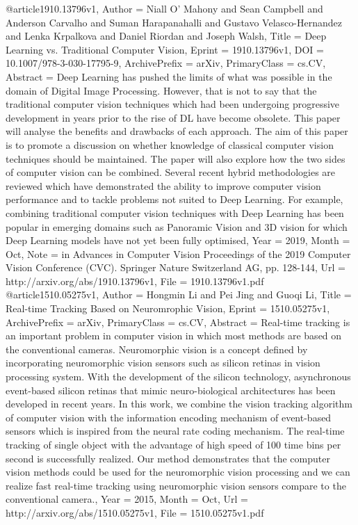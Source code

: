 @article{1910.13796v1,
Author        = {Niall O' Mahony and Sean Campbell and Anderson Carvalho and Suman Harapanahalli and Gustavo Velasco-Hernandez and Lenka Krpalkova and Daniel Riordan and Joseph Walsh},
Title         = {Deep Learning vs. Traditional Computer Vision},
Eprint        = {1910.13796v1},
DOI           = {10.1007/978-3-030-17795-9},
ArchivePrefix = {arXiv},
PrimaryClass  = {cs.CV},
Abstract      = {Deep Learning has pushed the limits of what was possible in the domain of
Digital Image Processing. However, that is not to say that the traditional
computer vision techniques which had been undergoing progressive development in
years prior to the rise of DL have become obsolete. This paper will analyse the
benefits and drawbacks of each approach. The aim of this paper is to promote a
discussion on whether knowledge of classical computer vision techniques should
be maintained. The paper will also explore how the two sides of computer vision
can be combined. Several recent hybrid methodologies are reviewed which have
demonstrated the ability to improve computer vision performance and to tackle
problems not suited to Deep Learning. For example, combining traditional
computer vision techniques with Deep Learning has been popular in emerging
domains such as Panoramic Vision and 3D vision for which Deep Learning models
have not yet been fully optimised},
Year          = {2019},
Month         = {Oct},
Note          = {in Advances in Computer Vision Proceedings of the 2019 Computer
  Vision Conference (CVC). Springer Nature Switzerland AG, pp. 128-144},
Url           = {http://arxiv.org/abs/1910.13796v1},
File          = {1910.13796v1.pdf}
}
@article{1510.05275v1,
Author        = {Hongmin Li and Pei Jing and Guoqi Li},
Title         = {Real-time Tracking Based on Neuromrophic Vision},
Eprint        = {1510.05275v1},
ArchivePrefix = {arXiv},
PrimaryClass  = {cs.CV},
Abstract      = {Real-time tracking is an important problem in computer vision in which most
methods are based on the conventional cameras. Neuromorphic vision is a concept
defined by incorporating neuromorphic vision sensors such as silicon retinas in
vision processing system. With the development of the silicon technology,
asynchronous event-based silicon retinas that mimic neuro-biological
architectures has been developed in recent years. In this work, we combine the
vision tracking algorithm of computer vision with the information encoding
mechanism of event-based sensors which is inspired from the neural rate coding
mechanism. The real-time tracking of single object with the advantage of high
speed of 100 time bins per second is successfully realized. Our method
demonstrates that the computer vision methods could be used for the
neuromorphic vision processing and we can realize fast real-time tracking using
neuromorphic vision sensors compare to the conventional camera.},
Year          = {2015},
Month         = {Oct},
Url           = {http://arxiv.org/abs/1510.05275v1},
File          = {1510.05275v1.pdf}
}
